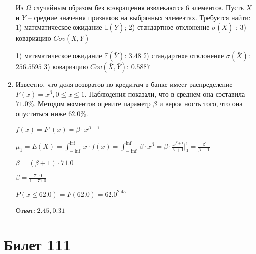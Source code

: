 \documentclass[a4paper,12pt]{article}
\begin{document}
\begin{enumerate}
Из $\Omega$ случайным образом без возвращения извлекаются $6$ элементов. 
Пусть $\bar X$ и $\bar Y$ – средние значения признаков на выбранных элементах. 
Требуется найти: 1) математическое ожидание $\mathbb{E}(\bar Y)$; 2) стандартное отклонение $\sigma(\bar X)$ ; 
3) ковариацию $Cov(\bar X, \bar Y)$




1) математическое ожидание $\mathbb{E}(\bar Y)$: $3.48$ 
2) стандартное отклонение $\sigma(\bar X)$: $256.5595$
3) ковариацию $Cov(\bar X, \bar Y)$: $0.5887$


\item

    
	Известно, что доля возвратов по кредитам в банке имеет распределение $F(x) = x^{\beta}, 0 \le x \le 1$. Наблюдения показали, что в среднем она составила $71.0$\%. Методом моментов оцените параметр $\beta$ и вероятность того, что она опуститься ниже $62.0$\%.
	


	

	$f(x) = F'(x) = \beta \cdot x^{\beta - 1}$

	$\mu_{1} = E(X) = \int_{-\inf}^{\inf}x \cdot f(x) = \int_{-\inf}^{\inf} \beta \cdot x^{\beta} = \beta \cdot \frac{x^{\beta + 1}}{\beta + 1}\bigg|_0^1 = \frac{\beta}{\beta + 1}$

	$\beta = (\beta + 1) \cdot 71.0$

	$\beta = \frac{71.0}{1 - 71.0}$

	$ P(x \le 62.0) = F(62.0) = 62.0^{2.45} $

    Ответ: $2.45, 0.31$
	


\end{enumerate}

\section{Билет 111}
\end{document}
